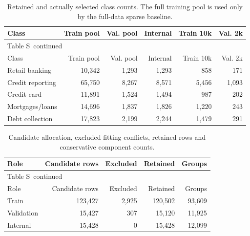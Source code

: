 \documentclass[10pt,a4paper]{article}
\renewcommand{\thetable}{S\arabic{table}}
\begin{document}
{\small
\setlength{\tabcolsep}{4pt}
\begin{longtable}{@{}lrrrrr@{}}
\caption{Retained and actually selected class counts. The full training pool is used only by the full-data sparse baseline.}\label{sup:classes}\\
\toprule
Class & Train pool & Val. pool & Internal & Train 10k & Val. 2k \\
\midrule\endfirsthead
\multicolumn{6}{l}{\small Table \thetable\ continued}\\
\toprule
Class & Train pool & Val. pool & Internal & Train 10k & Val. 2k \\
\midrule\endhead
\bottomrule\endfoot
Retail banking & 10,342 & 1,293 & 1,293 & 858 & 171 \\
Credit reporting & 65,750 & 8,267 & 8,571 & 5,456 & 1,093 \\
Credit card & 11,891 & 1,524 & 1,494 & 987 & 202 \\
Mortgages/loans & 14,696 & 1,837 & 1,826 & 1,220 & 243 \\
Debt collection & 17,823 & 2,199 & 2,244 & 1,479 & 291 \\
\end{longtable}
}


{\small
\setlength{\tabcolsep}{4pt}
\begin{longtable}{@{}lrrrr@{}}
\caption{Candidate allocation, excluded fitting conflicts, retained rows and conservative component counts.}\label{sup:flow}\\
\toprule
Role & Candidate rows & Excluded & Retained & Groups \\
\midrule\endfirsthead
\multicolumn{5}{l}{\small Table \thetable\ continued}\\
\toprule
Role & Candidate rows & Excluded & Retained & Groups \\
\midrule\endhead
\bottomrule\endfoot
Train & 123,427 & 2,925 & 120,502 & 93,609 \\
Validation & 15,427 & 307 & 15,120 & 11,925 \\
Internal & 15,428 & 0 & 15,428 & 12,099 \\
\end{longtable}
}
\end{document}
